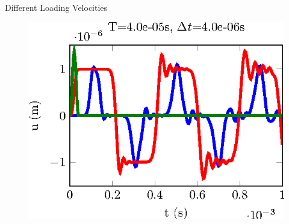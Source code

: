 \documentclass[12pt]{beamer}
\begin{document}
\begin{frame}{Different Loading Velocities}
\begin{figure}
\begin{minipage}{0.24\linewidth}
			\includegraphics[width=1\linewidth]{CalculSchem3-T1-tikz.eps}
		\end{minipage}
	\end{figure}
	\vspace{-0.4cm}
	

\end{frame}
\end{document}
